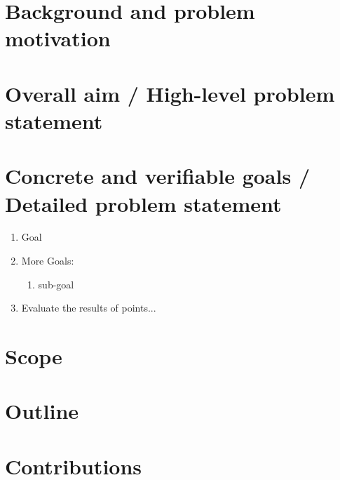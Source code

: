 \section{Background and problem motivation}

\section{Overall aim / High-level problem statement}

\section{Concrete and verifiable goals / Detailed problem statement}
\begin{enumerate}
    \item Goal
    \item More Goals:
    \begin{enumerate}[label*=\arabic*.]
        \item sub-goal
    \end{enumerate} 
    \item Evaluate the results of points...
\end{enumerate}
\section{Scope}

\section{Outline}

\section{Contributions}
